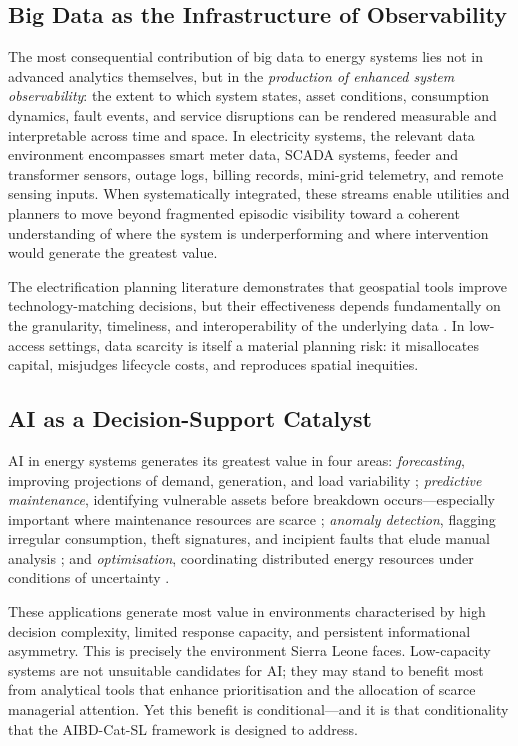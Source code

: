 \documentclass[preprint,12pt]{elsarticle}
\begin{document}
\subsection{Big Data as the Infrastructure of Observability}

The most consequential contribution of big data to energy
systems lies not in advanced analytics themselves, but in
the \textit{production of enhanced system observability}:
the extent to which system states, asset conditions,
consumption dynamics, fault events, and service disruptions
can be rendered measurable and interpretable across time
and space. In electricity systems, the relevant data
environment encompasses smart meter data, SCADA systems,
feeder and transformer sensors, outage logs, billing records,
mini-grid telemetry, and remote sensing inputs. When
systematically integrated, these streams enable utilities
and planners to move beyond fragmented episodic visibility
toward a coherent understanding of where the system is
underperforming and where intervention would generate the
greatest value.

The electrification planning literature demonstrates that
geospatial tools improve technology-matching decisions, but
their effectiveness depends fundamentally on the granularity,
timeliness, and interoperability of the underlying data
\cite{Korkovelos2019}. In low-access settings, data scarcity
is itself a material planning risk: it misallocates capital,
misjudges lifecycle costs, and reproduces spatial inequities.

\subsection{AI as a Decision-Support Catalyst}

AI in energy systems generates its greatest value in four
areas: \textit{forecasting}, improving projections of demand,
generation, and load variability \cite{Yousef2023};
\textit{predictive maintenance}, identifying vulnerable assets
before breakdown occurs---especially important where maintenance
resources are scarce \cite{Chatterjee2022};
\textit{anomaly detection}, flagging irregular consumption,
theft signatures, and incipient faults that elude manual
analysis \cite{Ahmad2021}; and \textit{optimisation},
coordinating distributed energy resources under conditions
of uncertainty \cite{Arevalo2024}.

These applications generate most value in environments
characterised by high decision complexity, limited response
capacity, and persistent informational asymmetry. This is
precisely the environment Sierra Leone faces. Low-capacity
systems are not unsuitable candidates for AI; they may stand
to benefit most from analytical tools that enhance
prioritisation and the allocation of scarce managerial
attention. Yet this benefit is conditional---and it is that
conditionality that the AIBD-Cat-SL framework is designed to address.
\end{document}
